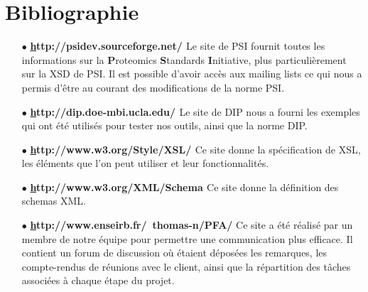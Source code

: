 \chapter{Bibliographie}


\begin{itemize}

\item[$\bullet$] {\bf {\underline http://psidev.sourceforge.net/ }}
Le site de PSI fournit toutes les informations sur la {\bf P}roteomics
{\bf S}tandards {\bf I}nitiative, plus particuli\`erement sur la XSD de 
PSI. Il est possible d'avoir acc\`es aux mailing lists ce qui nous a 
permis d'\^etre au courant des modifications de la norme PSI. \\
\item[$\bullet$] {\bf {\underline http://dip.doe-mbi.ucla.edu/ }}
Le site de DIP nous a fourni les exemples qui ont \'et\'e utilis\'es 
pour tester nos outils, ainsi que la norme DIP.\\
\item[$\bullet$] {\bf {\underline http://www.w3.org/Style/XSL/ }}
Ce site donne la sp\'ecification de XSL, les \'el\'ements que l'on peut 
utiliser et leur fonctionnalit\'es.\\
\item[$\bullet$] {\bf {\underline http://www.w3.org/XML/Schema }}
Ce site donne la d\'efinition des schemas XML.\\
\item[$\bullet$] {\bf {\underline http://www.enseirb.fr/~thomas-n/PFA/}}
Ce site a \'et\'e r\'ealis\'e par un membre de notre \'equipe pour 
permettre une communication plus efficace. Il 
contient un forum de discussion o\`u \'etaient d\'epos\'ees les remarques, 
les compte-rendus de r\'eunions avec le client, ainsi que la r\'epartition 
des t\^aches associ\'ees \`a chaque \'etape du projet.\\

\end{itemize}